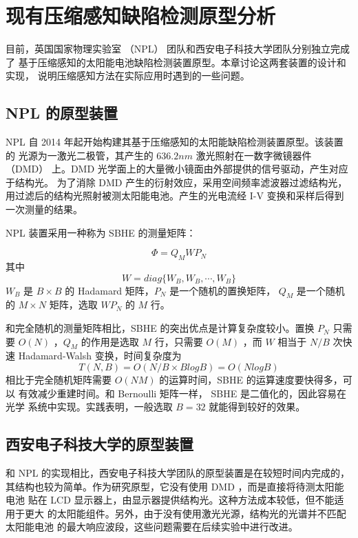 \chapter{现有压缩感知缺陷检测原型分析}

目前，英国国家物理实验室 （NPL） 团队和西安电子科技大学团队分别独立完成了
基于压缩感知的太阳能电池缺陷检测装置原型。本章讨论这两套装置的设计和实现，
说明压缩感知方法在实际应用时遇到的一些问题。

\section{NPL 的原型装置}

NPL 自 2014 年起开始构建其基于压缩感知的太阳能缺陷检测装置原型。该装置的
光源为一激光二极管，其产生的 $636.2 nm$ 激光照射在一数字微镜器件 （DMD）
上。DMD 光学面上的大量微小镜面由外部提供的信号驱动，产生对应于结构光。
为了消除 DMD 产生的衍射效应，采用空间频率滤波器过滤结构光，
用过滤后的结构光照射被测太阳能电池。产生的光电流经 I-V
变换和采样后得到一次测量的结果。

NPL 装置采用一种称为 SBHE 的测量矩阵：\cite{BlockHadamard}
\begin{definition}[SBHE 矩阵]
\begin{equation}
\Phi = Q_M W P_N
\end{equation}
其中
\begin{equation}
W = diag\{W_B, W_B, \cdots, W_B\}
\end{equation}
$W_B$ 是 $B \times B$ 的 Hadamard 矩阵，$P_N$ 是一个随机的置换矩阵，
$Q_M$ 是一个随机的 $M \times N$ 矩阵，选取 $W P_N$ 的 $M$ 行。
\end{definition}

和完全随机的测量矩阵相比，SBHE 的突出优点是计算复杂度较小。置换
$P_N$ 只需要 $O(N)$ ，$Q_M$ 的作用是选取 $M$ 行，只需要 $O(M)$ ，而
$W$ 相当于 $N/B$ 次快速 Hadamard-Walsh 变换，时间复杂度为
\begin{equation}
T(N,B) = O(N/B \times B log B) = O(NlogB)
\end{equation}
相比于完全随机矩阵需要 $O(NM)$ 的运算时间，SBHE 的运算速度要快得多，可以
有效减少重建时间。和 Bernoulli 矩阵一样， SBHE 是二值化的，因此容易在光学
系统中实现。实践表明，一般选取 $B=32$ 就能得到较好的效果。

\section{西安电子科技大学的原型装置}

和 NPL 的实现相比，西安电子科技大学团队的原型装置是在较短时间内完成的，
其结构也较为简单。作为研究原型，它没有使用 DMD ，而是直接将待测太阳能电池
贴在 LCD 显示器上，由显示器提供结构光。这种方法成本较低，但不能适用于更大
的太阳能组件。另外，由于没有使用激光光源，结构光的光谱并不匹配太阳能电池
的最大响应波段，这些问题需要在后续实验中进行改进。


